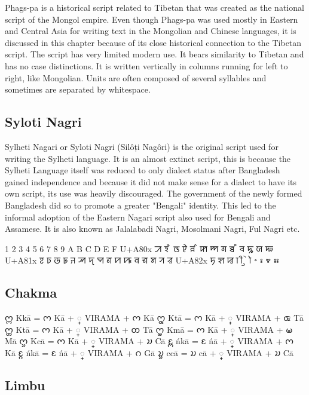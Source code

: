 Phags-pa is a historical script related to Tibetan that was created as the national script of
the Mongol empire. Even though Phags-pa was used mostly in Eastern and Central Asia for
writing text in the Mongolian and Chinese languages, it is discussed in this chapter because
of its close historical connection to the Tibetan script. The script has very limited modern use. It bears similarity to Tibetan and has no case distinctions. It is written vertically in columns running for left to right, like Mongolian. Units are often composed of several syllables and sometimes are separated by whitespace.


\subsection{Syloti Nagri}
Sylheti Nagari or Syloti Nagri (Silôṭi Nagôri) is the original script used for writing the Sylheti language. It is an almost extinct script, this is because the Sylheti Language itself was reduced to only dialect status after Bangladesh gained independence and because it did not make sense for a dialect to have its own script, its use was heavily discouraged. The government of the newly formed Bangladesh did so to promote a greater "Bengali" identity. This led to the informal adoption of the Eastern Nagari script also used for Bengali and Assamese. It is also known as Jalalabadi Nagri, Mosolmani Nagri, Ful Nagri etc.

\newfontfamily{}
\newfontfamily{}
\bgroup
\damase
{}	1	2	3	4	5	6	7	8	9	A	B	C	D	E	F
U+A80x	ꠀ	ꠁ	ꠂ	ꠃ	ꠄ	ꠅ	꠆	ꠇ	ꠈ	ꠉ	ꠊ	ꠋ	ꠌ	ꠍ	ꠎ	ꠏ
U+A81x	ꠐ	ꠑ	ꠒ	ꠓ	ꠔ	ꠕ	ꠖ	ꠗ	ꠘ	ꠙ	ꠚ	ꠛ	ꠜ	ꠝ	ꠞ	ꠟ
U+A82x	ꠠ	ꠡ	ꠢ	ꠣ	ꠤ	ꠥ	ꠦ	ꠧ	꠨	꠩	꠪	꠫
\egroup

\subsection{Chakma}

\newfontfamily{}

\bgroup
\chakma
𑄇𑄳𑄇 Kkā = 𑄇 Kā + 𑄳 VIRAMA + 𑄇 Kā
𑄇𑄳𑄑 Ktā = 𑄇 Kā + 𑄳 VIRAMA + 𑄑 Tā
𑄇𑄳𑄖 Ktā = 𑄇 Kā + 𑄳 VIRAMA + 𑄖 Tā
𑄇𑄳𑄟 Kmā = 𑄇 Kā + 𑄳 VIRAMA + 𑄟 Mā
𑄇𑄳𑄌 Kcā = 𑄇 Kā + 𑄳 VIRAMA + 𑄌 Cā
𑄋𑄳𑄇 ńkā = 𑄋 ńā + 𑄳 VIRAMA + 𑄇 Kā
𑄋𑄳𑄉 ńkā = 𑄋 ńā + 𑄳 VIRAMA + 𑄉 Gā
𑄌𑄳𑄌 ccā = 𑄌 cā + 𑄳 VIRAMA + 𑄌 Cā

\egroup

\subsection{Limbu}

